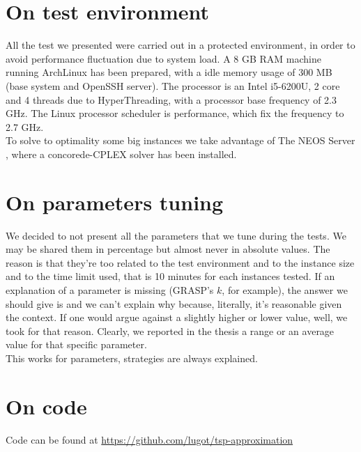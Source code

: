 \section{On test environment}
\label{appendix:testenv}
All the test we presented were carried out in a protected environment, in order
to avoid performance fluctuation due to system load. A 8 GB RAM machine running
ArchLinux has been prepared, with a idle memory usage of 300 MB (base system and
OpenSSH server). The processor is an Intel i5-6200U, 2 core and 4 threads due to
HyperThreading, with a processor base frequency of 2.3 GHz. The Linux processor
scheduler is performance, which fix the frequency to 2.7 GHz.\\

To solve to optimality some big instances we take advantage of The NEOS Server
\citep{czyzyk1998neos}, where a concorede-CPLEX solver has been installed.


\section{On parameters tuning}
\label{appendix:tuning}
We decided to not present all the parameters that we tune during the tests. We
may be shared them in percentage but almost never in absolute values. The reason is
that they're too related to the test environment and to the instance size and to
the time limit used, that is 10 minutes for each instances tested. If an
explanation of a parameter is missing (GRASP's $k$, for example), the answer we
should give is  and we can't explain why
because, literally, it's reasonable given the context. If one would argue
against a slightly higher or lower value, well, we took for that reason.
Clearly, we reported in the thesis a range or an average value for that specific
parameter.\\
This works for parameters, strategies are always explained.

\section{On code}
Code can be found at \href{https://github.com/lugot/tsp-approximation}{https://github.com/lugot/tsp-approximation} 
